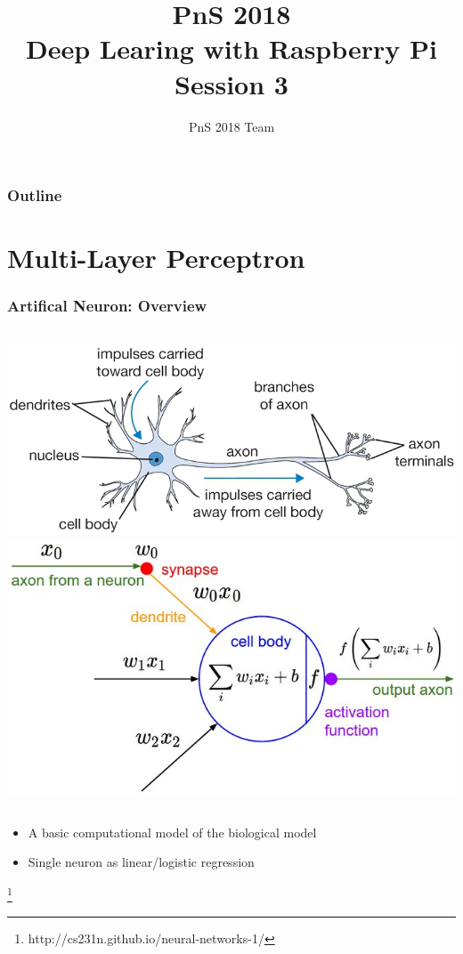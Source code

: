 \documentclass{beamer}
\title[PnS2018]{\textbf{PnS 2018} \\
\textbf{\normalsize Deep Learing with Raspberry Pi}\\
\normalsize Session 3}
\author{PnS 2018 Team}
\institute[INI-UZH/ETHz]{Institute of Neuroinformatics \\
University of Z\"urich and ETH Z\"urich}
\date{}
\newcommand\blfootnote[1]{%
  \begingroup
  \renewcommand\thefootnote{}\footnote{#1}%
  \addtocounter{footnote}{-1}%
  \endgroup
}
\begin{document}
\titlepage

\begin{frame}
\frametitle{Outline}

\tableofcontents
\end{frame}

\section{Multi-Layer Perceptron}

\begin{frame}
  \frametitle{Artifical Neuron: Overview}
  \begin{columns}
  \includegraphics[width=\textwidth]{neuron.png}
  \includegraphics[width=\textwidth]{neuron_model.jpeg}
  \end{columns}
  \begin{itemize}
  \item A basic computational model of the biological model
  \item Single neuron as linear/logistic regression
  \end{itemize}
  \blfootnote{http://cs231n.github.io/neural-networks-1/}
\end{frame}
\end{document}
